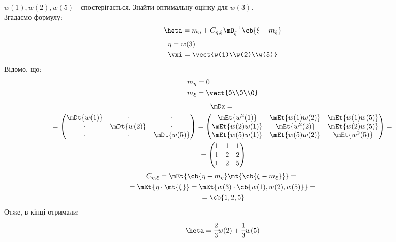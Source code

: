 \begin{tsk}
$w(1),w(2),w(5)$ - спостерігається. Знайти оптимальну оцінку для $w(3)$.\\
Згадаємо формулу:
\begin{equation}
\heta = m_\eta + C_{\eta,\xi} \mD^{-1}_\xi \cb{\xi-m_\xi}
\end{equation}
\begin{eqnarray}
&\eta = w(3)\\
&\vxi = \vect{w(1)\\w(2)\\w(5)}
\end{eqnarray}
Відомо, що:
\begin{eqnarray}
&m_\eta = 0\\
&m_\xi = \vect{0\\0\\0}
\end{eqnarray}
\begin{multline}
\mDx ={}\\{}= \begin{pmatrix}
\mDt{w(1)} & \cdot & \cdot \\
\cdot & \mDt{w(2)} & \cdot\\
\cdot &\cdot & \mDt{w(5)} 
\end{pmatrix} = \begin{pmatrix}
\mEt{w^2(1)} & \mEt{w(1)w(2)} & \mEt{w(1)w(5)}\\
\mEt{w(2)w(1)} &\mEt{w^2(2)} & \mEt{w(2)w(5)}\\
\mEt{w(5)w(1)} & \mEt{w(5)w(2)} & \mEt{w^2(5)}
\end{pmatrix} ={}\\{} =
\begin{pmatrix}
1 & 1 & 1 \\
1 & 2 & 2\\
1 & 2 & 5
\end{pmatrix}
\end{multline}
\begin{multline}
C_{\eta,\xi} = \mEt{\cb{\eta-m_\eta}\mt{\cb{\xi-m_\xi}}} ={}\\{}= \mEt{\eta\cdot \mt{\xi}} = \mEt{w(3) \cdot \cb{w(1),w(2),w(5)}} = {}\\{} = \cb{1,2,5}
\end{multline}
Отже, в кінці отримали:
\begin{equation}
\heta = \cfrac23 w(2) + \cfrac13 w(5)
\end{equation}
\end{tsk} 
